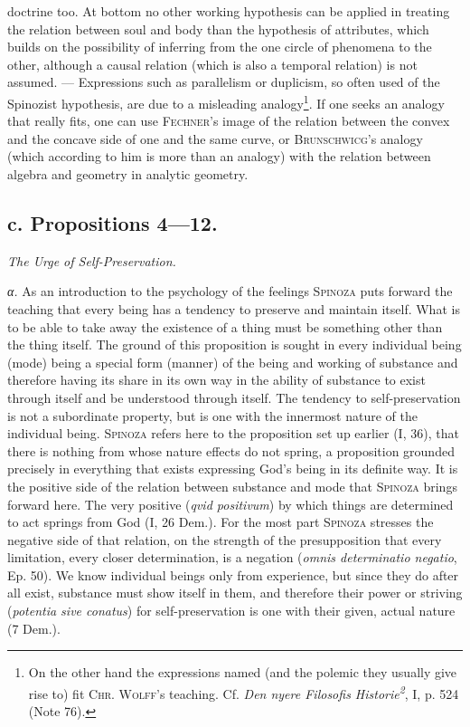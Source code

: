 \documentclass[12pt]{article}
\newcommand{\opage}[1]{\marginnote{\footnotesize\textit{[#1]}}}
\begin{document}
doctrine too. At bottom no other working hypothesis can be applied in treating the relation
between soul and body than the hypothesis of attributes, which builds on the possibility of
inferring from the one circle of phenomena to the other, although a causal relation (which is
also a temporal relation) is not assumed. --- Expressions such as parallelism or duplicism, so
often used of the Spinozist hypothesis, are due to a misleading analogy\footnote{On the other
hand the expressions named (and the polemic they usually give rise to) fit \textsc{Chr.
Wolff}'s teaching. Cf. \textit{Den nyere Filosofis Historie\textsuperscript{2}}, I, p. 524
(Note 76).}. If one seeks an analogy that really fits, one can use \textsc{Fechner}'s image of
the relation between the convex and the concave side of one and the same curve, or
\textsc{Brunschwicg}'s analogy (which according to him is more than an analogy) with the relation
between algebra and geometry in analytic geometry.

\subsection*{c. Propositions 4---12.}
\begin{center}\textit{The Urge of Self-Preservation.}\end{center}

\textit{α.} As an introduction to the psychology of the feelings \textsc{Spinoza} puts forward
the teaching that every being has a tendency to preserve and maintain itself. What is to be able
to take away the existence of a thing must be something other than the thing itself. The ground
of this proposition is sought in every individual being (mode) being a special form (manner) of
the being and working of substance and therefore having its share in its own way in the ability
of substance to exist through itself and be understood through itself. The tendency to
self-preservation is not a subordinate property, but is one with the innermost nature of the
individual being. \opage{61}\textsc{Spinoza} refers here to the proposition set up earlier (I,
36), that there is nothing from whose nature effects do not spring, a proposition grounded
precisely in everything that exists expressing God's being in its definite way. It is the
positive side of the relation between substance and mode that \textsc{Spinoza} brings forward
here. The very positive (\textit{qvid positivum}) by which things are determined to act springs
from God (I, 26 Dem.). For the most part \textsc{Spinoza} stresses the negative side of that
relation, on the strength of the presupposition that every limitation, every closer
determination, is a negation (\textit{omnis determinatio negatio}, Ep. 50). We know individual
beings only from experience, but since they do after all exist, substance must show itself in
them, and therefore their power or striving (\textit{potentia sive conatus}) for
self-preservation is one with their given, actual nature (7 Dem.).
\end{document}
